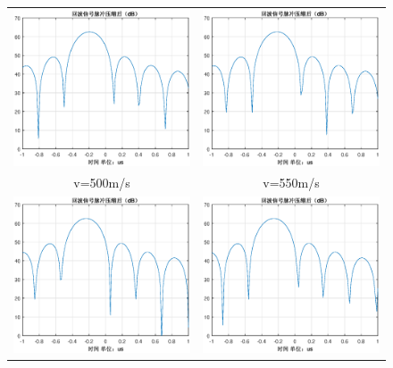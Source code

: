 \documentclass[12pt]{article}
\begin{document}
\begin{figure}[htbp]
  \centering
  \begin{tabular}{cc}
    \includegraphics[width=.5\textwidth]{Doppler_sensitivity_0500}&\includegraphics[width=.5\textwidth]{Doppler_sensitivity_0550}\\
    v=500m/s&v=550m/s\\
    \includegraphics[width=.5\textwidth]{Doppler_sensitivity_0600}&\includegraphics[width=.5\textwidth]{Doppler_sensitivity_0650}\\

\end{tabular}
\end{figure}
\end{document}

